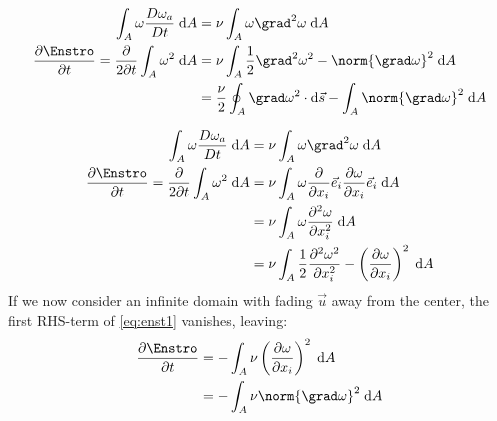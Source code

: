 \begin{equation}\begin{split}
	\int_A \omega \frac{D \omega_{a}}{D t}\; \mathrm{d}A
	&=
	\nu\int_A  \omega \grad^{2} \omega\; \mathrm{d}A\\
	\frac{\partial \Enstro}{\partial t}
	=
	\frac{\partial }{2\partial t} \int_A \omega^2 \; \mathrm{d}A
	&=
	\nu\int_A \frac{1}{2}\grad^{2} \omega^{2} - \norm{\grad \omega}^2  \; \mathrm{d}A \\
	&=
	\frac{\nu}{2}\oint_A \grad \omega^{2} \cdot \mathrm{d}\vec{s}
	- \int_A\norm{\grad \omega}^2  \; \mathrm{d}A \label{eq:enst1}	\\
\end{split}\end{equation}


\begin{equation}\begin{split}
	\int_A \omega \frac{D \omega_{a}}{D t}\; \mathrm{d}A
	&=
	\nu\int_A  \omega \grad^{2} \omega\; \mathrm{d}A\\
	\frac{\partial \Enstro}{\partial t}
	=
	\frac{\partial }{2\partial t} \int_A \omega^2 \; \mathrm{d}A
	&=
	\nu\int_A \omega  \frac{\partial }{\partial x_i} \vec{e}_i \frac{\partial  \omega}{\partial x_i} \vec{e}_i\; \mathrm{d}A \\
	&=
	\nu\int_A \omega  \frac{\partial^2  \omega}{\partial x_i^2} \; \mathrm{d}A \\
	&=
	\nu\int_A \frac{1}{2} \frac{\partial^2 \omega^2 }{\partial x_i^2}  - \left(\frac{\partial  \omega}{\partial x_i} \right)^2 \; \mathrm{d}A \label{eq:enst1}
\end{split}\end{equation}
If we now consider an infinite domain with fading $\vec{u}$ away from the center,
the first RHS-term of \eqref{eq:enst1} vanishes, leaving:
\begin{equation}\begin{split}
	\frac{\partial \Enstro}{\partial t}
	&=
	- \int_A \nu\left(\frac{\partial  \omega}{\partial x_i} \right)^2 \; \mathrm{d}A \\
	&=
	- \int_A \nu\norm{ \grad \omega}^2 \; \mathrm{d}A
\end{split}\end{equation}



